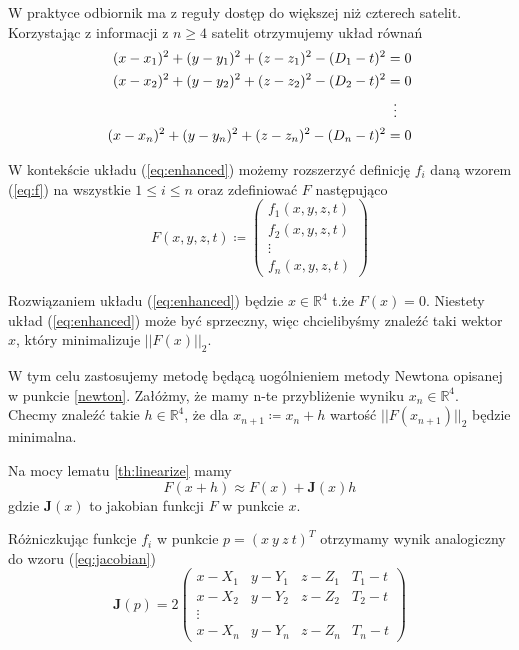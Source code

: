 \documentclass{article}
\begin{document}
W praktyce odbiornik ma z reguły dostęp do większej niż czterech satelit.
Korzystając z informacji z $n \geq 4$ satelit otrzymujemy układ równań
\begin{align}
\begin{aligned}
    \label{eq:enhanced}
    (x-x_1)^2 + (y-y_1)^2 + (z-z_1)^2 - (D_1 -t)^2 &= 0 \\
    (x-x_2)^2 + (y-y_2)^2 + (z-z_2)^2 - (D_2 -t)^2 &= 0 \\
    &\vdotswithin{=} \\
    (x-x_n)^2 + (y-y_n)^2 + (z-z_n)^2 - (D_n -t)^2 &= 0 \\
\end{aligned}
\end{align}

W kontekście układu (\ref{eq:enhanced}) możemy rozszerzyć definicję $f_i$ daną wzorem (\ref{eq:f})
na wszystkie $1 \leq i \leq n$ oraz zdefiniować $F$ następująco
\begin{equation}
    \label{eq:newF}
    F(x, y, z, t) \coloneqq
    \begin{pmatrix}
        f_1(x, y, z, t) \\
        f_2(x, y, z, t) \\
        \vdots \\
        f_n(x, y, z, t)
    \end{pmatrix}
\end{equation}

Rozwiązaniem układu (\ref{eq:enhanced}) będzie $x \in \mathbb{R}^4$ t.że $F(x) = 0$. Niestety układ (\ref{eq:enhanced})
może być sprzeczny, więc chcielibyśmy znaleźć taki wektor $x$, który minimalizuje $||F(x)||_2$.

W tym celu zastosujemy metodę będącą uogólnieniem metody Newtona opisanej w punkcie \ref{newton}.
Załóżmy, że mamy n-te przybliżenie wyniku $x_n \in \mathbb{R}^4$. Checmy znaleźć takie $h \in \mathbb{R}^4$,
że dla $x_{n+1} \coloneqq x_n + h$ wartość $||F(x_{n+1})||_2$ będzie minimalna.

Na mocy lematu \ref{th:linearize} mamy
\begin{equation}
    \label{eq:linearizedNewF}
    F(x + h) \approx F(x) + \mathbf{J}(x)h
\end{equation}
gdzie $\mathbf{J}(x)$ to jakobian funkcji $F$ w punkcie $x$.

Różniczkując funkcje $f_i$ w punkcie $p = (x \ y \ z \ t)^T$ otrzymamy wynik analogiczny do wzoru (\ref{eq:jacobian})
\[
\mathbf{J}(p) = 2
\begin{pmatrix}
    x-X_1  & y-Y_1 & z-Z_1 & T_1-t \\
    x-X_2  & y-Y_2 & z-Z_2 & T_2-t \\
    \vdots \\
    x-X_n  & y-Y_n & z-Z_n & T_n-t
\end{pmatrix}
\]
\end{document}
